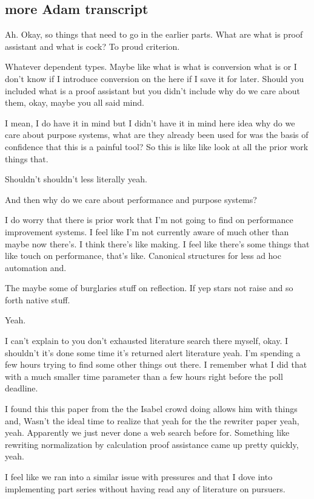\begin{subappendices}
\section{more Adam transcript}
Ah. Okay, so things that need to go in the earlier parts. What are what is proof assistant and what is cock? To proud criterion.

Whatever dependent types. Maybe like what is what is conversion what is or I don't know if I introduce conversion on the here if I save it for later. Should you included what is a proof assistant but you didn't include why do we care about them, okay, maybe you all said mind.

I mean, I do have it in mind but I didn't have it in mind here idea why do we care about purpose systems, what are they already been used for was the basis of confidence that this is a painful tool? So this is like like look at all the prior work things that.

Shouldn't shouldn't less literally yeah.

And then why do we care about performance and purpose systems?

I do worry that there is prior work that I'm not going to find on performance improvement systems. I feel like I'm not currently aware of much other than maybe now there's. I think there's like making. I feel like there's some things that like touch on performance, that's like. Canonical structures for less ad hoc automation and.

The maybe some of burglaries stuff on reflection. If yep stars not raise and so forth native stuff.

Yeah.

I can't explain to you don't exhausted literature search there myself, okay. I shouldn't it's done some time it's returned alert literature yeah. I'm spending a few hours trying to find some other things out there. I remember what I did that with a much smaller time parameter than a few hours right before the poll deadline.

I found this this paper from the the Isabel crowd doing allows him with things and, Wasn't the ideal time to realize that yeah for the the rewriter paper yeah, yeah. Apparently we just never done a web search before for. Something like rewriting normalization by calculation proof assistance came up pretty quickly, yeah.

I feel like we ran into a similar issue with pressures and that I dove into implementing part series without having read any of literature on pursuers.


\end{subappendices}
